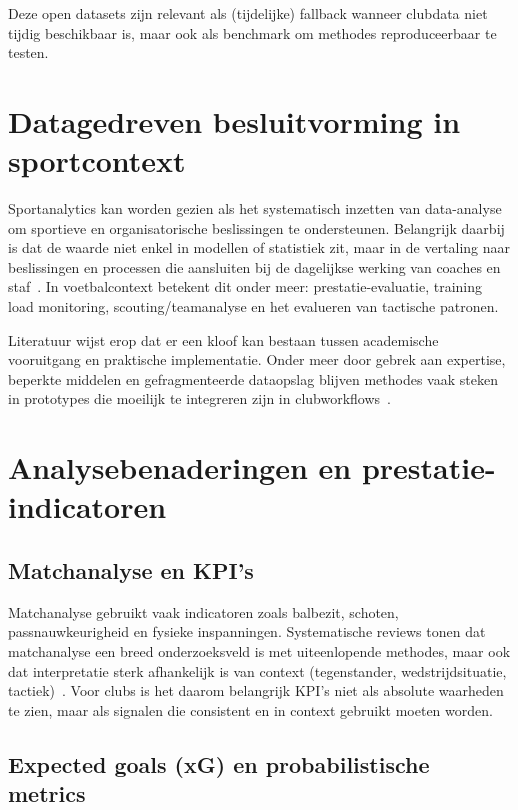 Deze open datasets zijn relevant als (tijdelijke) fallback wanneer clubdata niet tijdig beschikbaar is, maar ook als benchmark om methodes reproduceerbaar te testen.

\section{Datagedreven besluitvorming in sportcontext}

Sportanalytics kan worden gezien als het systematisch inzetten van data-analyse om sportieve en organisatorische beslissingen te ondersteunen.
Belangrijk daarbij is dat de waarde niet enkel in modellen of statistiek zit, maar in de vertaling naar beslissingen en processen die aansluiten bij de dagelijkse werking van coaches en staf~\autocite{Alamar2013}.
In voetbalcontext betekent dit onder meer: prestatie-evaluatie, training load monitoring, scouting/teamanalyse en het evalueren van tactische patronen.

Literatuur wijst erop dat er een kloof kan bestaan tussen academische vooruitgang en praktische implementatie. Onder meer door gebrek aan expertise, beperkte middelen en gefragmenteerde dataopslag blijven methodes vaak steken in prototypes die moeilijk te integreren zijn in clubworkflows~\autocite{Rein2016}.

\section{Analysebenaderingen en prestatie-indicatoren}

\subsection{Matchanalyse en KPI's}

Matchanalyse gebruikt vaak indicatoren zoals balbezit, schoten, passnauwkeurigheid en fysieke inspanningen.
Systematische reviews tonen dat matchanalyse een breed onderzoeksveld is met uiteenlopende methodes, maar ook dat interpretatie sterk afhankelijk is van context (tegenstander, wedstrijdsituatie, tactiek)~\autocite{Sarmento2014}.
Voor clubs is het daarom belangrijk KPI's niet als absolute waarheden te zien, maar als signalen die consistent en in context gebruikt moeten worden.

\subsection{Expected goals (xG) en probabilistische metrics}


